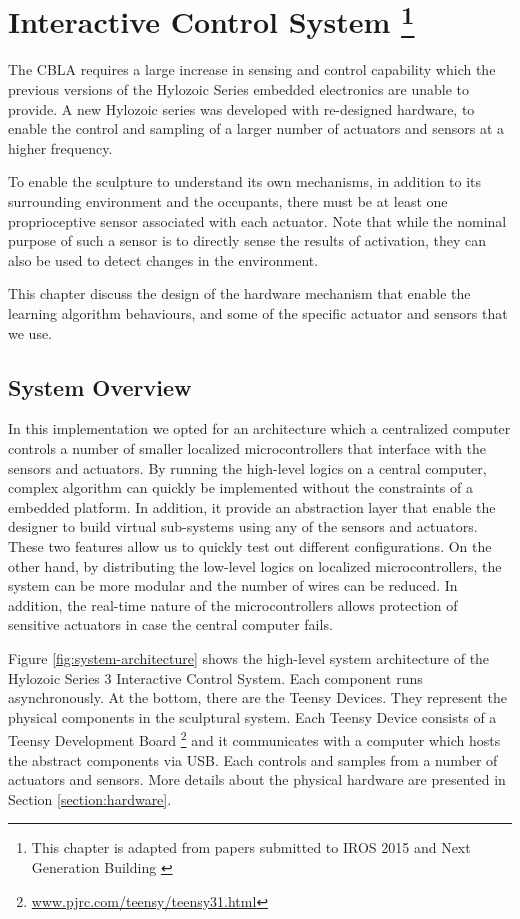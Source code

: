 \chapter[Interactive Control System]
{Interactive Control System 
	\footnote{This chapter is adapted from papers submitted to IROS 2015 \cite{Chan2015} and Next Generation Building \cite{Gorbet2015}}} 
\label{chap:ctrl_system}

The CBLA requires a large increase in sensing and control capability which the previous versions of the Hylozoic Series embedded electronics \cite{Beesley2007.book} are unable to provide. A new Hylozoic series was developed with re-designed hardware, to enable the control and sampling of a larger number of actuators and sensors at a higher frequency. 

To enable the sculpture to understand its own mechanisms, in addition to its surrounding environment and the occupants, there must be at least one proprioceptive sensor associated with each actuator. Note that while the nominal purpose of such a sensor is to directly sense the results of activation, they can also be used to detect changes in the environment.

This chapter discuss the design of the hardware mechanism that enable the learning algorithm behaviours, and some of the specific actuator and sensors that we use. 


\section{System Overview}

In this implementation we opted for an architecture which a centralized computer controls a number of smaller localized microcontrollers that interface with the sensors and actuators. By running the high-level logics on a central computer, complex algorithm can quickly be implemented without the constraints of a embedded platform. In addition, it provide an abstraction layer that enable the designer to build virtual sub-systems using any of the sensors and actuators. These two features allow us to quickly test out different configurations. 
On the other hand, by distributing the low-level logics on localized microcontrollers, the system can be more modular and the number of wires can be reduced. In addition, the real-time nature of the microcontrollers allows protection of sensitive actuators in case the central computer fails. 


Figure \ref{fig:system-architecture} shows the high-level system architecture of the Hylozoic Series 3 Interactive Control System. Each component runs asynchronously. At the bottom, there are the Teensy Devices. They represent the physical components in the sculptural system. Each Teensy Device consists of a Teensy Development Board \footnote{\url{www.pjrc.com/teensy/teensy31.html}} and it communicates with a computer which hosts the abstract components via USB. Each controls and samples from a number of actuators and sensors. More details about the physical hardware are presented in Section \ref{section:hardware}. 

